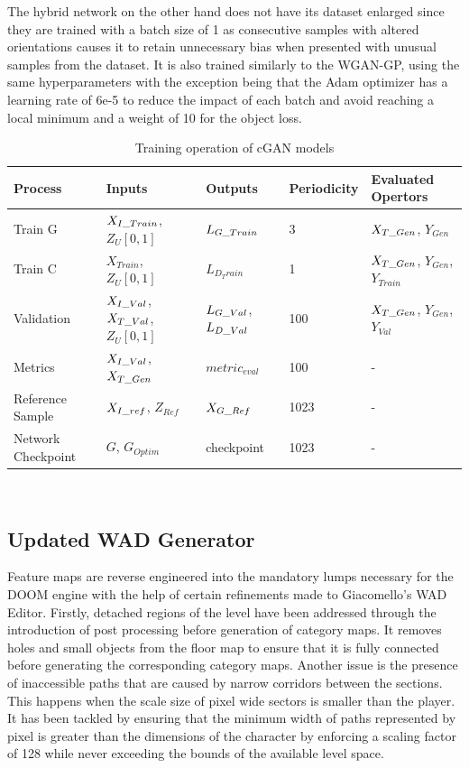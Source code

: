 \documentclass{Configuration_Files/PoliMi3i_thesis}
\begin{document}
The hybrid network on the other hand does not have its dataset enlarged since they 
are trained with a batch size of 1 as consecutive samples with altered orientations 
causes it to retain unnecessary bias when presented with unusual samples from the 
dataset. It is also trained similarly to the WGAN-GP, using the same hyperparameters 
with the exception being that the Adam optimizer has a learning rate of 6e-5 to reduce 
the impact of each batch and avoid reaching a local minimum and a weight of 10 for the object loss.
\begin{table}[H]
\centering 
\begin{tabular}{ |C{2.5cm}|C{2.5cm}|C{2.5cm}|C{2.5cm}|C{2.5cm}|}
\hline
\textbf{Process} & \textbf{Inputs} & \textbf{Outputs} & \textbf{Periodicity} & \textbf{Evaluated Opertors} \\
\hline
Train G & $X_{I\char`_Train}$, $Z_{U}[0,1]$ & $L_{G\char`_Train}$ & 3 & $X_{T\char`_Gen}$, $Y_{Gen}$\\
\hline
Train C & $X_{Train}$, $Z_{U}[0,1]$ & $L_{D_Train}$ & 1 & $X_{T\char`_Gen}$, $Y_{Gen}$, $Y_{Train}$\\
\hline
Validation & $X_{I\char`_Val}$, $X_{T\char`_Val}$, $Z_{U}[0,1]$ & $L_{G\char`_Val}$, $L_{D\char`_Val}$ & 100 & $X_{T\char`_Gen}$, $Y_{Gen}$, $Y_{Val}$\\
\hline
Metrics & $X_{I\char`_Val}$, $X_{T\char`_Gen}$ & $metric_{eval}$ & 100 & -\\
\hline
Reference Sample & $X_{I\char`_ref}$, $Z_{Ref}$ & $X_{G\char`_Ref}$ & 1023 & -\\
\hline
Network Checkpoint & $G$, $G_{Optim}$ & checkpoint & 1023 & -\\
\hline
\end{tabular}
\\[10pt]
\caption{Training operation of cGAN models}
\label{table:cgantrain}
\end{table}

\subsection{Updated WAD Generator}
Feature maps are reverse engineered into the mandatory lumps necessary for
the DOOM engine with the help of certain refinements made to Giacomello’s WAD 
Editor. Firstly, detached regions of the level have been addressed through the 
introduction of post processing before generation of category maps. It removes holes 
and small objects from the floor map to ensure that it is fully connected before 
generating the corresponding category maps. Another issue is the presence of inaccessible 
paths that are caused by narrow corridors between the sections. This happens when the scale 
size of pixel wide sectors is smaller than the player. It has been tackled by ensuring that 
the minimum width of paths represented by pixel is greater than the dimensions of the character 
by enforcing a scaling factor of 128 while never exceeding the bounds of the available level space.
\end{document}
